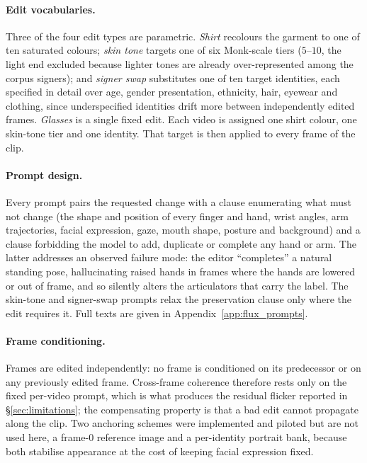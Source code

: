 \paragraph{Edit vocabularies.}
Three of the four edit types are parametric. \emph{Shirt} recolours the
garment to one of ten saturated colours; \emph{skin tone} targets one of
six Monk-scale tiers ($5$--$10$, the light end excluded because lighter
tones are already over-represented among the corpus signers); and
\emph{signer swap} substitutes one of ten target identities, each
specified in detail over age, gender presentation, ethnicity, hair,
eyewear and clothing, since underspecified identities drift more between
independently edited frames. \emph{Glasses} is a single fixed edit. Each
video is assigned one shirt colour, one skin-tone tier and one identity. That target is then applied to every frame
of the clip.

\paragraph{Prompt design.}
Every prompt pairs the requested change with a clause enumerating what
must not change (the shape and position of every finger and hand, wrist
angles, arm trajectories, facial expression, gaze, mouth shape, posture
and background) and a clause forbidding the model to add, duplicate or
complete any hand or arm. The latter addresses an observed failure mode:
the editor ``completes'' a natural standing pose, hallucinating raised
hands in frames where the hands are lowered or out of frame, and so
silently alters the articulators that carry the label. The skin-tone and
signer-swap prompts relax the preservation clause only where the edit
requires it. Full texts are given in Appendix~\ref{app:flux_prompts}.

\paragraph{Frame conditioning.}
Frames are edited independently: no frame is conditioned on its
predecessor or on any previously edited frame. Cross-frame coherence
therefore rests only on the fixed per-video prompt, which is what produces
the residual flicker reported in \S\ref{sec:limitations}; the compensating
property is that a bad edit cannot propagate along the clip. Two anchoring
schemes were implemented and piloted but are not used here, a frame-0
reference image and a per-identity portrait bank, because both stabilise
appearance at the cost of keeping facial expression fixed.

